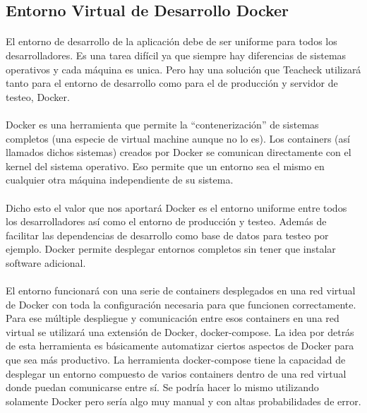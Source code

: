 \subsection{Entorno Virtual de Desarrollo Docker}
\paragraph{}
El entorno de desarrollo de la aplicación debe de ser uniforme para todos los desarrolladores. Es una tarea difícil ya que siempre hay diferencias de sistemas operativos y cada máquina es unica. Pero hay una solución que Teacheck utilizará tanto para el entorno de desarrollo como para el de producción y servidor de testeo, Docker.

\paragraph{}
Docker es una herramienta que permite la “contenerización” de sistemas completos (una especie de virtual machine aunque no lo es). Los containers (así llamados dichos sistemas) creados por Docker se comunican directamente con el kernel del sistema operativo. Eso permite que un entorno sea el mismo en cualquier otra máquina independiente de su sistema.

\paragraph{}
Dicho esto el valor que nos aportará Docker es el entorno uniforme entre todos los desarrolladores así como el entorno de producción y testeo. Además de facilitar las dependencias de desarrollo como base de datos para testeo por ejemplo. Docker permite desplegar entornos completos sin tener que instalar software adicional.

\paragraph{}
El entorno funcionará con una serie de containers desplegados en una red virtual de Docker con toda la configuración necesaria para que funcionen correctamente. Para ese múltiple despliegue y comunicación entre esos containers en una red virtual se utilizará una extensión de Docker, docker-compose. La idea por detrás de esta herramienta es básicamente automatizar ciertos aspectos de Docker para que sea más productivo. La herramienta docker-compose tiene la capacidad de desplegar un entorno compuesto de varios containers dentro de una red virtual donde puedan comunicarse entre sí. Se podría hacer lo mismo utilizando solamente Docker pero sería algo muy manual y con altas probabilidades de error.

